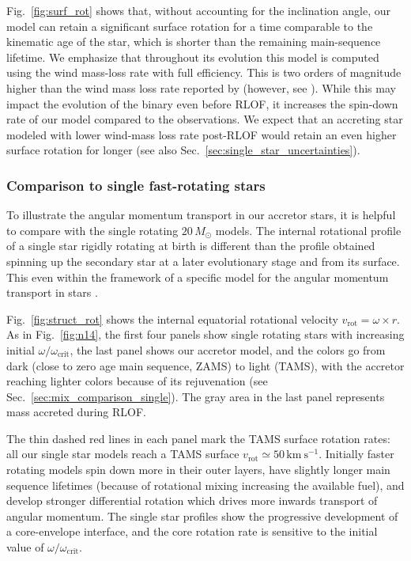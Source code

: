 \documentclass[twocolumn,twocolappendix,trackchanges]{aastex63}
\newcommand{\kms}{{\mathrm{km\ s^{-1}}}}
\DeclareRobustCommand{\Figref}[1]{Fig.~\ref{#1}}
\DeclareRobustCommand{\Secref}[1]{Sec.~\ref{#1}}
\begin{document}
\Figref{fig:surf_rot} shows that, without accounting for the
inclination angle, our model can retain a significant surface rotation
for a time comparable to the kinematic age of the star, which is
shorter than the remaining main-sequence lifetime. We emphasize that
throughout its evolution this model is computed using the
\cite{vink:00, vink:01} wind mass-loss rate with full efficiency. This
is two orders of magnitude higher than the wind mass loss rate
reported by \cite{marcolino:09} (however, see
\citealt{lucy:12}). While this may impact the evolution of the
binary even before RLOF, it increases the spin-down rate of
our model compared to the observations. We expect that an accreting star
modeled with lower wind-mass loss rate post-RLOF would retain an even
higher surface rotation for longer (see also \Secref{sec:single_star_uncertainties}).


\subsubsection{Comparison to single fast-rotating stars}


To illustrate the angular momentum transport in our accretor stars, it
is helpful to compare with the single rotating $20\,M_\odot$
models. The internal rotational profile of a single star rigidly rotating at
birth is different than the profile obtained spinning up the secondary
star at a later evolutionary stage and from its surface. This even within
the framework of a specific model for the angular momentum transport
in stars \citep{spruit:02}.

\Figref{fig:struct_rot} shows the internal equatorial
rotational velocity $v_\mathrm{rot}=\omega\times r$. As in
\Figref{fig:n14}, the first four panels show single rotating stars
with increasing initial $\omega/\omega_\mathrm{crit}$, the last panel
shows our accretor model, and the colors go from dark (close to zero
age main sequence, ZAMS) to light
(TAMS), with the accretor reaching lighter colors because of its
rejuvenation (see \Secref{sec:mix_comparison_single}). The gray area in the last panel represents mass accreted
during RLOF.

The thin dashed red lines in each panel mark the TAMS surface rotation
rates: all our single star models reach a TAMS surface
$v_\mathrm{rot}\simeq50\,\kms$. Initially faster rotating models spin
down more in their outer layers, have slightly longer main sequence
lifetimes (because of rotational mixing increasing the available fuel), and develop stronger differential rotation which
drives more inwards transport of angular momentum. The single star
profiles show the progressive development of a core-envelope
interface, and the core rotation rate is sensitive to the initial
value of $\omega/\omega_\mathrm{crit}$.
\end{document}
